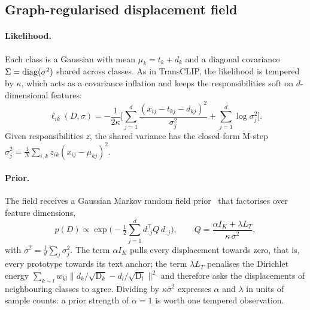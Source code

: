 \subsection{Graph-regularised displacement field}
\label{sec:field}
\paragraph{Likelihood.}
Each class is a Gaussian with mean $\mu_k = t_k + d_k$ and a diagonal covariance $\Sigma=\operatorname{diag}(\sigma^2)$ shared across classes. As in TransCLIP, the likelihood is tempered by $\kappa$, which acts as a covariance inflation and keeps the responsibilities soft on $d$-dimensional features:
\begin{equation}
  \ell_{ik}(D,\sigma) = -\frac{1}{2\kappa}\Big[\sum_{j=1}^{d}\frac{(x_{ij}-t_{kj}-d_{kj})^2}{\sigma_j^2} + \sum_{j=1}^{d}\log\sigma_j^2\Big].
  \label{eq:lik}
\end{equation}
Given responsibilities $z$, the shared variance has the closed-form M-step $\sigma_j^2 = \tfrac{1}{N}\sum_{i,k} z_{ik}(x_{ij}-\mu_{kj})^2$.

\paragraph{Prior.}
The field receives a Gaussian Markov random field prior~\cite{rue2005gmrf} that factorises over feature dimensions,
\begin{equation}
  p(D) \propto \exp\Big(-\tfrac{1}{2}\sum_{j=1}^{d} d_{:j}^{\top} Q\, d_{:j}\Big),\qquad
  Q = \frac{\alpha I_K + \lambda L_T}{\kappa\,\bar{\sigma}^2},
  \label{eq:prior}
\end{equation}
with $\bar{\sigma}^2 = \tfrac{1}{d}\sum_j\sigma_j^2$. The term $\alpha I_K$ pulls every displacement towards zero, that is, every prototype towards its text anchor; the term $\lambda L_T$ penalises the Dirichlet energy $\sum_{k\sim l} w_{kl}\|d_k/\sqrt{\mathrm{D}_k} - d_l/\sqrt{\mathrm{D}_l}\|^2$ and therefore asks the displacements of neighbouring classes to agree. Dividing by $\kappa\bar{\sigma}^2$ expresses $\alpha$ and $\lambda$ in units of sample counts: a prior strength of $\alpha=1$ is worth one tempered observation.

